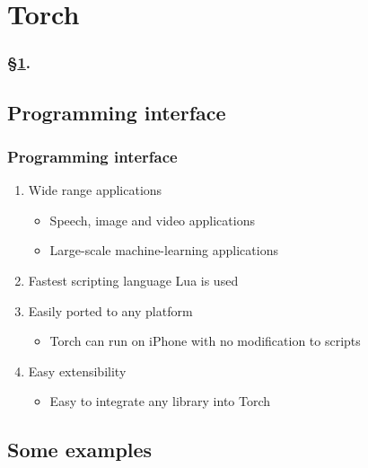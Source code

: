 
\section{Torch}\label{sec:Torch}


\frameinlbffalse

\begin{frame}[plain]
\frametitle{\S\ref{sec:Torch}. \insertsection}
\listofframes
\end{frame}
\addtocounter{framenumber}{-1} %

\frameinlbftrue

\subsection{Programming interface}

\begin{frame}
  \MyLogo
  \frametitle{Programming interface}  
\begin{enumerate}
\item Wide range applications
\begin{itemize}
\item Speech, image and video applications
\item  Large-scale machine-learning applications
\end{itemize}
\item Fastest scripting language Lua is used
\item Easily ported to any platform
\begin{itemize}
\item Torch can run on iPhone with no modification to scripts
\end{itemize}
\item Easy extensibility
\begin{itemize}
\item Easy to integrate any library into Torch
\end{itemize}
\end{enumerate}
\end{frame}

\subsection{Some examples}

